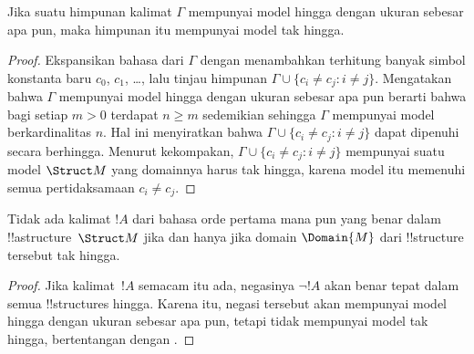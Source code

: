 \documentclass[../../../include/open-logic-section]{subfiles}
\begin{document}

\begin{thm}
 Jika suatu himpunan kalimat $\Gamma$ mempunyai model
hingga dengan ukuran sebesar apa pun, maka himpunan itu mempunyai model tak
hingga.
\end{thm}

\begin{proof}
Ekspansikan bahasa dari $\Gamma$ dengan menambahkan terhitung banyak simbol
konstanta baru $c_0$, $c_1$, \dots, lalu tinjau himpunan $\Gamma \cup
\{c_i \neq c_j : i \neq j\}$. Mengatakan bahwa $\Gamma$ mempunyai model
hingga dengan ukuran sebesar apa pun berarti bahwa bagi setiap $m >0$
terdapat $n\ge m$ sedemikian sehingga $\Gamma$ mempunyai model berkardinalitas
$n$. Hal ini menyiratkan bahwa $\Gamma \cup \{c_i \neq c_j : i \neq j\}$
dapat dipenuhi secara berhingga. Menurut kekompakan, $\Gamma \cup \{c_i
\neq c_j : i \neq j\}$ mempunyai suatu model $\Struct M$ yang domainnya
harus tak hingga, karena model itu memenuhi semua pertidaksamaan $c_i \neq
c_j$.
\end{proof}

\begin{prop}
Tidak ada kalimat $!A$ dari bahasa orde pertama mana pun yang benar dalam
!!a{structure}~$\Struct M$ jika dan hanya jika domain $\Domain{M}$ dari
!!{structure} tersebut tak hingga.
\end{prop}

\begin{proof}
Jika kalimat~$!A$ semacam itu ada, negasinya $\lnot !A$ akan benar tepat
dalam semua !!{structure}s hingga. Karena itu, negasi tersebut akan mempunyai
model hingga dengan ukuran sebesar apa pun, tetapi tidak mempunyai model tak
hingga, bertentangan dengan .
\end{proof}
\end{document}
